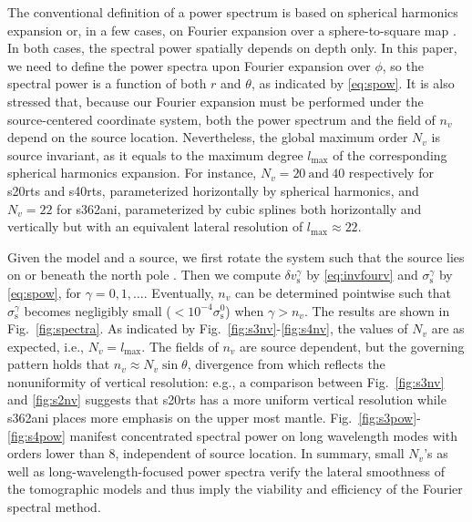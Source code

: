 \documentclass[extra]{gji}
\begin{document}
The conventional definition of a power spectrum is based on 
spherical harmonics expansion
\cite[]{su1991predominance, becker2002comparison} 
or, in a few cases, on Fourier expansion over a sphere-to-square map
\cite[]{chevrot1998spectrum}. In both cases, the spectral power spatially 
depends on depth only. In this paper, we need to define the power spectra
upon Fourier expansion over $\phi$, so the spectral 
power is a function of both $r$ and $\theta$, as indicated by \eqref{eq:spow}. 
It is also stressed that, because our Fourier expansion must be performed under 
the source-centered coordinate system, both the power spectrum and the field
of $n_v$ depend on the source location. Nevertheless, the global maximum 
order $N_v$ is source invariant, as it equals to the maximum degree 
$l_\text{max}$ of the corresponding spherical harmonics expansion. 
For instance, $N_v=20\ \text{and}\ 40$ 
respectively for s20rts and s40rts, parameterized horizontally 
by spherical harmonics, and $N_v=22$ for s362ani, parameterized by cubic 
splines both horizontally and vertically but with an equivalent lateral 
resolution of $l_\text{max}\approx 22$.

Given the model and a source, we first rotate the system such that 
the source lies on or beneath the north pole \cite[]{nissen2007axisem}. 
Then we compute $\delta v_{\text{s}}^\gamma$ by \eqref{eq:invfourv} and 
$\sigma_{\text{s}}^\gamma$ by \eqref{eq:spow}, for $\gamma=0,1,\dots$. 
Eventually, $n_v$ can be determined pointwise such that 
$\sigma_{\text{s}}^\gamma$ becomes negligibly small 
($<10^{-4}\sigma_{\text{s}}^0$) when $\gamma>n_v$. 
The results are shown in Fig.~\ref{fig:spectra}. As indicated by 
Fig.~\ref{fig:s3nv}-\ref{fig:s4nv}, the values of $N_v$ are as expected, 
i.e., $N_v=l_\text{max}$. The fields of $n_v$ are source dependent, but the 
governing pattern holds that $n_v\approx N_v\sin{\theta}$, divergence
from which reflects the nonuniformity of vertical resolution: e.g., a 
comparison between Fig.~\ref{fig:s3nv} and \ref{fig:s2nv} suggests that
s20rts has a more uniform vertical resolution while s362ani places more 
emphasis on the upper most mantle. Fig.~\ref{fig:s3pow}-\ref{fig:s4pow}
manifest concentrated spectral power on long wavelength modes with 
orders lower than 8, independent of source location.
In summary, small $N_v$'s as well as long-wavelength-focused power spectra 
verify the lateral smoothness of the tomographic models and thus 
imply the viability and efficiency of the Fourier spectral method.  
\end{document}
